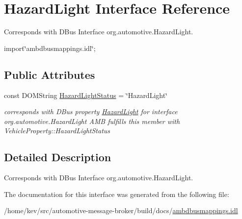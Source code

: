 \hypertarget{interfaceHazardLight}{\section{Hazard\+Light Interface Reference}
\label{interfaceHazardLight}
}


Corresponds with D\+Bus Interface org.\+automotive.\+Hazard\+Light.  




{\ttfamily import\char`\"{}ambdbusmappings.\+idl\char`\"{};}

\subsection*{Public Attributes}
\begin{DoxyCompactItemize}
\item 
\hypertarget{interfaceHazardLight_a12e9aaf0ed97600798da9564cba431f2}{const D\+O\+M\+String \hyperlink{interfaceHazardLight_a12e9aaf0ed97600798da9564cba431f2}{Hazard\+Light\+Status} = \char`\"{}Hazard\+Light\char`\"{}}\label{interfaceHazardLight_a12e9aaf0ed97600798da9564cba431f2}

\begin{DoxyCompactList}\small\item\em corresponds with D\+Bus property \hyperlink{interfaceHazardLight}{Hazard\+Light} for interface org.\+automotive.\+Hazard\+Light A\+M\+B fulfills this member with Vehicle\+Property\+::\+Hazard\+Light\+Status \end{DoxyCompactList}\end{DoxyCompactItemize}


\subsection{Detailed Description}
Corresponds with D\+Bus Interface org.\+automotive.\+Hazard\+Light. 

The documentation for this interface was generated from the following file\+:\begin{DoxyCompactItemize}
\item 
/home/kev/src/automotive-\/message-\/broker/build/docs/\hyperlink{ambdbusmappings_8idl}{ambdbusmappings.\+idl}\end{DoxyCompactItemize}
